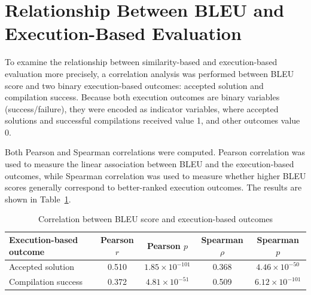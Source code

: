 

\section{Relationship Between BLEU and Execution-Based Evaluation}

To examine the relationship between similarity-based and execution-based
evaluation more precisely, a correlation analysis was performed between BLEU
score and two binary execution-based outcomes: accepted solution and compilation
success.  Because both execution outcomes are
binary variables (success/failure), they were encoded as indicator variables,
where accepted solutions and successful compilations received value 1, and
other outcomes value 0.

Both Pearson and Spearman correlations were computed. Pearson correlation was
used to measure the linear association between BLEU and the execution-based
outcomes, while Spearman correlation was used to measure whether higher BLEU
scores generally correspond to better-ranked execution outcomes. The results are
shown in Table~\ref{tab:bleu_execution_correlation}.

\begin{table}[b]
\centering
\caption{Correlation between BLEU score and execution-based outcomes}
\begin{tabular}{lcccc}
\hline
Execution-based outcome & Pearson $r$ & Pearson $p$ & Spearman $\rho$ & Spearman $p$ \\
\hline
Accepted solution & 0.510 & $1.85 \times 10^{-101}$ & 0.368 & $4.46 \times 10^{-50}$ \\
Compilation success & 0.372 & $4.81 \times 10^{-51}$ & 0.509 & $6.12 \times 10^{-101}$ \\
\hline
\end{tabular}
\label{tab:bleu_execution_correlation}
\end{table}

